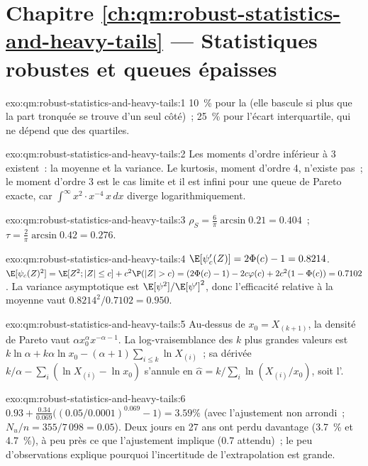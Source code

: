 \section*{Chapitre \ref{ch:qm:robust-statistics-and-heavy-tails} --- Statistiques robustes et queues épaisses}

\begin{solution}{exo:qm:robust-statistics-and-heavy-tails:1}
10~\% pour la  (elle bascule si plus que la part tronquée se trouve d'un seul côté)~; 25~\% pour l'écart interquartile, qui ne dépend que
des quartiles.
\end{solution}

\begin{solution}{exo:qm:robust-statistics-and-heavy-tails:2}
Les moments d'ordre inférieur à 3 existent~: la moyenne et la variance. Le kurtosis, moment d'ordre 4, n'existe pas~; le moment d'ordre 3 est le cas limite
et il est infini pour une queue de Pareto exacte, car $\int^\infty x^2 \cdot x^{-4}\,x\,dx$ diverge logarithmiquement.
\end{solution}

\begin{solution}{exo:qm:robust-statistics-and-heavy-tails:3}
$\rho_S = \frac6\pi\arcsin0.21 = 0.404$~; $\tau = \frac2\pi\arcsin0.42 = 0.276$.
\end{solution}

\begin{solution}{exo:qm:robust-statistics-and-heavy-tails:4}
$\E[\psi_c'(Z)] = 2\Phi(c) - 1 = 0.8214$. $\E[\psi_c(Z)^2] = \E[Z^2; |Z| \le c] + c^2\P(|Z| > c) = (2\Phi(c) - 1) - 2c\varphi(c) + 2c^2(1 - \Phi(c)) =
0.7102$. La variance asymptotique est $\E[\psi^2]/\E[\psi']^2$, donc l'efficacité relative à la moyenne vaut $0.8214^2/0.7102 = 0.950$.
\end{solution}

\begin{solution}{exo:qm:robust-statistics-and-heavy-tails:5}
Au-dessus de $x_0 = X_{(k+1)}$, la densité de Pareto vaut $\alpha x_0^\alpha x^{-\alpha-1}$. La log-vraisemblance des $k$ plus grandes valeurs est $k\ln\alpha + k\alpha\ln x_0 - (\alpha +
1)\sum_{i \le k}\ln X_{(i)}$~; sa dérivée $k/\alpha - \sum_i(\ln X_{(i)} - \ln x_0)$ s'annule en $\hat\alpha = k/\sum_i\ln(X_{(i)}/x_0)$, soit
l'.
\end{solution}

\begin{solution}{exo:qm:robust-statistics-and-heavy-tails:6}
$0.93 + \frac{0.34}{0.069}\bigl((0.05/0.0001)^{0.069} - 1\bigr) = 3.59\%$ (avec l'ajustement non arrondi~; $N_u/n = 355/7\,098 = 0.05$). Deux jours en 27 ans
ont perdu davantage (3.7~\% et 4.7~\%), à peu près ce que l'ajustement implique (0.7 attendu)~; le peu d'observations explique
pourquoi l'incertitude de l'extrapolation est grande.
\end{solution}

